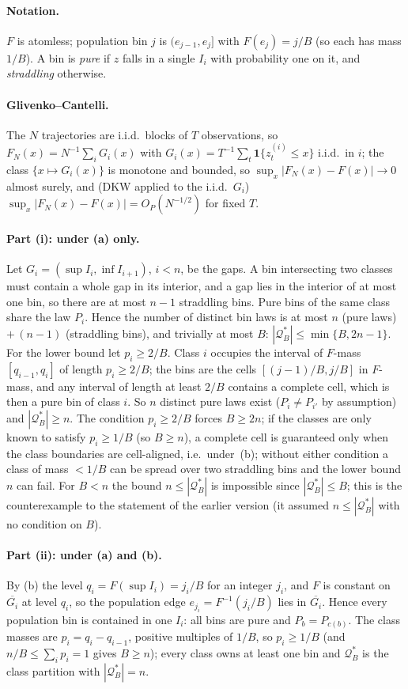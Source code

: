 \documentclass[10pt]{article}
\newcommand{\Qstar}{\mathcal{Q}^*}
\begin{document}
\paragraph{Notation.}
$F$ is atomless; population bin $j$ is $(e_{j-1},e_j]$ with $F(e_j)=j/B$ (so each
has mass $1/B$).  A bin is \emph{pure} if $z$ falls in a single $I_i$ with
probability one on it, and \emph{straddling} otherwise.

\paragraph{Glivenko--Cantelli.}
The $N$ trajectories are i.i.d.\ blocks of $T$ observations, so
$F_N(x)=N^{-1}\sum_i G_i(x)$ with $G_i(x)=T^{-1}\sum_t\mathbf 1\{z^{(i)}_t\le x\}$
i.i.d.\ in $i$; the class $\{x\mapsto G_i(x)\}$ is monotone and bounded, so
$\sup_x|F_N(x)-F(x)|\to0$ almost surely, and (DKW applied to the i.i.d.\
$G_i$) $\sup_x|F_N(x)-F(x)|=O_P(N^{-1/2})$ for fixed $T$.

\paragraph{Part (i): under (a) only.}
Let $G_i=(\sup I_i,\inf I_{i+1})$, $i<n$, be the gaps.  A bin intersecting two
classes must contain a whole gap in its interior, and a gap lies in the interior
of at most one bin, so there are at most $n-1$ straddling bins.  Pure bins of the
same class share the law $P_i$.  Hence the number of distinct bin laws is at most
$n$ (pure laws) $+\,(n-1)$ (straddling bins), and trivially at most $B$:
$|\Qstar_B|\le\min\{B,2n-1\}$.  For the lower bound let $p_i\ge2/B$.  Class $i$
occupies the interval of $F$-mass $[q_{i-1},q_i]$ of length $p_i\ge2/B$; the
bins are the cells $[(j{-}1)/B,j/B]$ in $F$-mass, and any interval of length at
least $2/B$ contains a complete cell, which is then a pure bin of class $i$.
So $n$ distinct pure laws exist ($P_i\neq P_{i'}$ by assumption) and
$|\Qstar_B|\ge n$.  The condition $p_i\ge2/B$ forces $B\ge2n$; if the classes are
only known to satisfy $p_i\ge1/B$ (so $B\ge n$), a complete cell is guaranteed
only when the class boundaries are cell-aligned, i.e.\ under~(b); without either
condition a class of mass $<1/B$ can be spread over two straddling bins and the
lower bound $n$ can fail.  For $B<n$ the bound $n\le|\Qstar_B|$ is impossible
since $|\Qstar_B|\le B$; this is the counterexample to the statement of the
earlier version (it assumed $n\le|\Qstar_B|$ with no condition on $B$).

\paragraph{Part (ii): under (a) and (b).}
By (b) the level $q_i=F(\sup I_i)=j_i/B$ for an integer $j_i$, and $F$ is
constant on $\overline{G_i}$ at level $q_i$, so the population edge
$e_{j_i}=F^{-1}(j_i/B)$ lies in $\overline{G_i}$.  Hence every population bin is
contained in one $I_i$: all bins are pure and $P_b=P_{c(b)}$.  The class masses
are $p_i=q_i-q_{i-1}$, positive multiples of $1/B$, so $p_i\ge1/B$ (and
$n/B\le\sum_ip_i=1$ gives $B\ge n$); every class owns at least one bin and
$\Qstar_B$ is the class partition with $|\Qstar_B|=n$.
\end{document}
